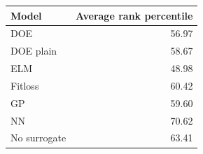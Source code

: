 \begin{tabular}{lr}
\toprule
Model & Average rank percentile \\
\midrule
DOE & 56.97 \\
DOE plain & 58.67 \\
ELM & 48.98 \\
Fitloss & 60.42 \\
GP & 59.60 \\
NN & 70.62 \\
No surrogate & 63.41 \\
\bottomrule
\end{tabular}
